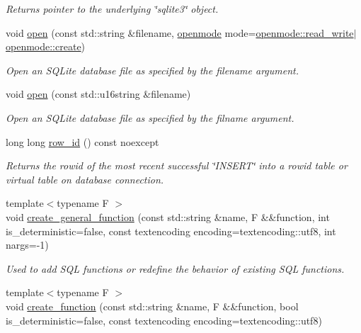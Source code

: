 \begin{DoxyCompactItemize}
\begin{DoxyCompactList}\small\item\em Returns pointer to the underlying \char`\"{}sqlite3\char`\"{} object. \end{DoxyCompactList}\item 
void \hyperlink{a00004_a84da73c4ff1b162624da3e252c2a86c8}{open} (const std\-::string \&filename, \hyperlink{a00038_ac886eded97b0430b2ab92e2d08fcf938}{openmode} mode=\hyperlink{a00038_ac886eded97b0430b2ab92e2d08fcf938a06ad287ea83b37a6f9db3d8d10d72c8f}{openmode\-::read\-\_\-write}$\vert$\hyperlink{a00038_ac886eded97b0430b2ab92e2d08fcf938a76ea0bebb3c22822b4f0dd9c9fd021c5}{openmode\-::create})
\begin{DoxyCompactList}\small\item\em Open an S\-Q\-Lite database file as specified by the filename argument. \end{DoxyCompactList}\item 
void \hyperlink{a00004_ac31065d17d9cbe1e1b3021bf11ff0229}{open} (const std\-::u16string \&filename)
\begin{DoxyCompactList}\small\item\em Open an S\-Q\-Lite database file as specified by the filname argument. \end{DoxyCompactList}\item 
long long \hyperlink{a00004_add860c9b2c630bcfc178e3a7e878ea1b}{row\-\_\-id} () const noexcept
\begin{DoxyCompactList}\small\item\em Returns the rowid of the most recent successful \char`\"{}\-I\-N\-S\-E\-R\-T\char`\"{} into a rowid table or virtual table on database connection. \end{DoxyCompactList}\item 
{\footnotesize template$<$typename F $>$ }\\void \hyperlink{a00004_a3cc15c8f2784e6b706a5992c8014c2dd}{create\-\_\-general\-\_\-function} (const std\-::string \&name, F \&\&function, int is\-\_\-deterministic=false, const textencoding encoding=textencoding\-::utf8, int nargs=-\/1)
\begin{DoxyCompactList}\small\item\em Used to add S\-Q\-L functions or redefine the behavior of existing S\-Q\-L functions. \end{DoxyCompactList}\item 
{\footnotesize template$<$typename F $>$ }\\void \hyperlink{a00004_ad42c081096ec64f35710aa021f2f4b56}{create\-\_\-function} (const std\-::string \&name, F \&\&function, bool is\-\_\-deterministic=false, const textencoding encoding=textencoding\-::utf8)

\end{DoxyCompactItemize}
